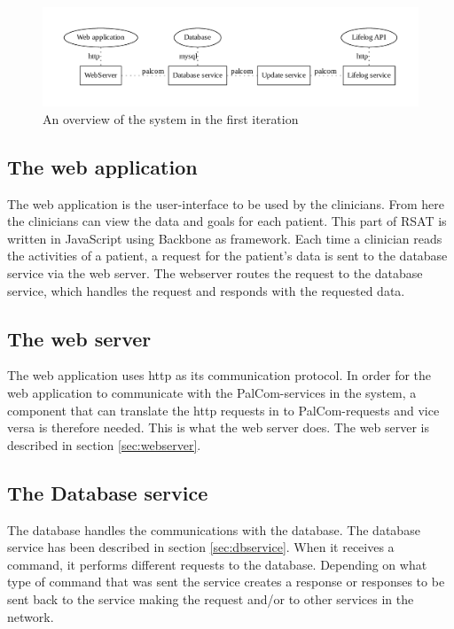 \documentclass{cslthse-msc}
\begin{document}
\begin{figure}[!hbt]
\centering
\includegraphics[scale=0.6]{second-version.pdf} 
\caption{An overview of the system in the first iteration}\label{fig:second-version}
\end{figure}

\subsection{The web application}

The web application is the user-interface to be used by the clinicians. From here the clinicians can view the data and goals for each patient. This part of RSAT is written in JavaScript using Backbone as framework. Each time a clinician reads the activities of a patient, a request for the patient’s data is sent to the database service via the web server.  The webserver routes the request to the database service, which handles the request and responds with the requested data.

\subsection{The web server}

The web application uses http as its communication protocol. In order for the web application to communicate with the PalCom-services in the system, a component that can translate the http requests in to PalCom-requests and vice versa is therefore needed. This is what the web server does. The web server is described in section \ref{sec:webserver}. 


\subsection{The Database service}

The database handles the communications with the database. The database service has been described in section \ref{sec:dbservice}. When it receives a command, it performs different requests to the database. Depending on what type of command that was sent the service creates a response or responses to be sent back to the service making the request and/or to other services in the network.
\end{document}
